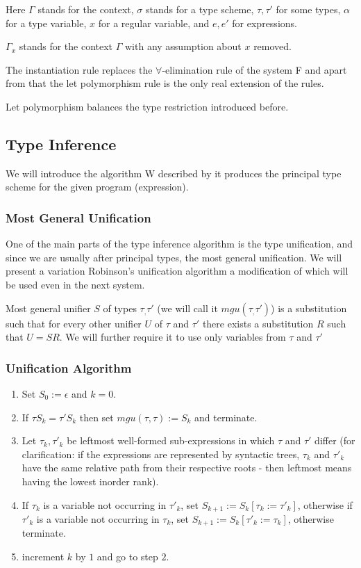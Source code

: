 Here $\Gamma$ stands for the context, $\sigma$ stands for a type scheme, $\tau, \tau'$ for some types, $\alpha$ for a type variable, $x$ for a regular variable, and $e, e'$ for expressions.

$\Gamma_x$ stands for the context $\Gamma$ with any assumption about $x$ removed.

The instantiation rule replaces the $\forall$-elimination rule of the system F and apart from that the let polymorphism rule is the only real extension of the rules.

Let polymorphism balances the type restriction introduced before.

\subsection{Type Inference}

We will introduce the algorithm W described by %
it produces the principal type scheme for the given program (expression).

\subsubsection{Most General Unification}

One of the main parts of the type inference algorithm is the type unification, and since we are usually after principal types, the most general unification.
We will present a variation Robinson's unification algorithm a modification of which will be used even in the next system.

Most general unifier $S$ of types $\tau_, \tau'$ (we will call it $mgu (\tau_, \tau')$) is a substitution such that for every other unifier $U$ of $\tau$ and $\tau'$ there exists a substitution $R$ such that $U = S R$. %
We will further require it to use only variables from $\tau$ and $\tau'$

\subsubsection{Unification Algorithm}

\begin{enumerate}
    \item Set $S_0 := \epsilon$ and $k = 0$.
    \item If $\tau S_k = \tau' S_k$ then set $mgu(\tau,\tau) := S_k$ and terminate.
    \item Let $\tau_k, \tau'_k$ be leftmost well-formed sub-expressions in which $\tau$ and $\tau'$ differ (for clarification: if the expressions are represented by syntactic trees, $\tau_k$ and $\tau'_k$ have the same relative path from their respective roots - then leftmost means having the lowest inorder rank).
    \item If $\tau_k$ is a variable not occurring in $\tau'_k$, set $S_{k+1} := S_k [\tau_k := \tau'_k]$, otherwise if $\tau'_k$ is a variable not occurring in $\tau_k$, set $S_{k+1} := S_k [\tau'_k := \tau_k]$, otherwise terminate.
    \item increment $k$ by $1$ and go to step $2$.
\end{enumerate}

